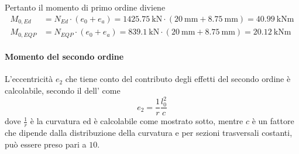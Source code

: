 Pertanto il momento di primo ordine diviene
\begin{equation}
    \begin{split}
        M_{0,Ed} &= N_{Ed}\cdot(e_0 + e_a)  = \SI{1425.75}{\kilo\newton} \cdot (\SI{20}{\milli\metre} + \SI{8.75}{\milli\metre} ) = \SI{40.99}{\kilo\newton\metre} \\
        M_{0,EQP} &= N_{EQP}\cdot(e_0 + e_a)  = \SI{839.1}{\kilo\newton} \cdot (\SI{20}{\milli\metre} + \SI{8.75}{\milli\metre} ) = \SI{20.12}{\kilo\newton\metre}
    \end{split}
\end{equation}


\paragraph{Momento del secondo ordine}
L'eccentricità $e_2$ che tiene conto del contributo degli effetti del secondo ordine è calcolabile, secondo il  dell'  come 
\begin{equation}
    e_2 = \frac{1}{r} \frac{l_0 ^ 2}{c}
\end{equation}
dove $\frac{1}{r}$ è la curvatura ed è calcolabile come mostrato sotto, mentre $c$ è un fattore che dipende dalla distribuzione della curvatura e  per sezioni trasversali costanti, può essere preso pari a $10$.

